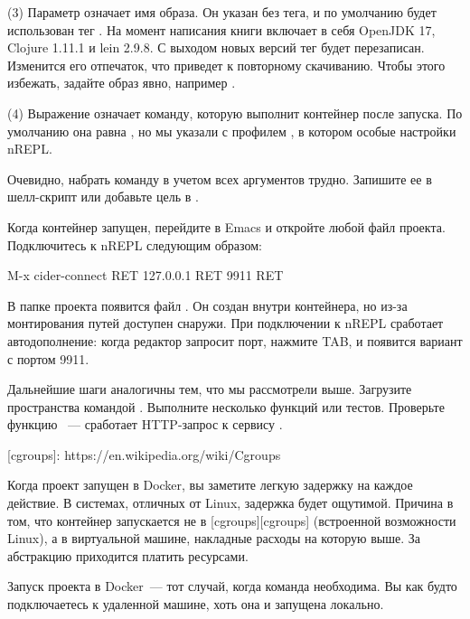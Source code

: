 (3) Параметр  означает имя образа. Он указан без тега, и по умолчанию будет использован тег . На момент написания книги  включает в себя OpenJDK 17, Clojure 1.11.1 и lein 2.9.8. С выходом новых версий тег  будет перезаписан. Изменится его отпечаток, что приведет к повторному скачиванию. Чтобы этого избежать, задайте образ явно, например .

(4) Выражение  означает команду, которую выполнит контейнер после запуска. По умолчанию она равна , но мы указали  с профилем , в котором особые настройки nREPL.

Очевидно, набрать команду  в учетом всех аргументов трудно. Запишите ее в шелл-скрипт или добавьте цель в .

Когда контейнер запущен, перейдите в Emacs и откройте любой файл проекта. Подключитесь к nREPL следующим образом:

\begin{english}
  \begin{text}
M-x cider-connect RET 127.0.0.1 RET 9911 RET
  \end{text}
\end{english}

В папке проекта появится файл . Он создан внутри контейнера, но из-за монтирования путей доступен снаружи. При подключении к nREPL сработает автодополнение: когда редактор запросит порт, нажмите TAB, и появится вариант с портом 9911.

Дальнейшие шаги аналогичны тем, что мы рассмотрели выше. Загрузите пространства командой . Выполните несколько функций или тестов. Проверьте функцию ~--- сработает HTTP-запрос к сервису .

[cgroups]: https://en.wikipedia.org/wiki/Cgroups

Когда проект запущен в Docker, вы заметите легкую задержку на каждое действие. В системах, отличных от Linux, задержка будет ощутимой. Причина в том, что контейнер запускается не в [cgroups][cgroups] (встроенной возможности Linux), а в виртуальной машине, накладные расходы на которую выше. За абстракцию приходится платить ресурсами.

Запуск проекта в Docker~--- тот случай, когда команда  необходима. Вы как будто подключаетесь к удаленной машине, хоть она и запущена локально.

